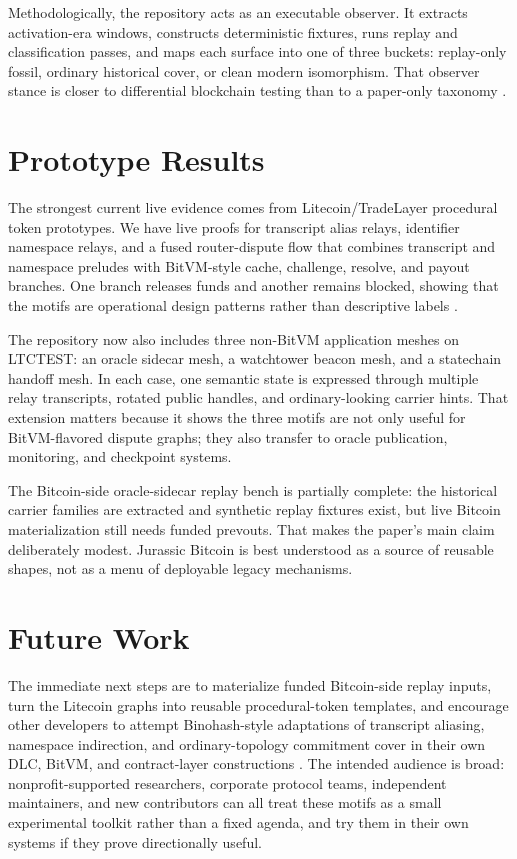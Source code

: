 \documentclass[10pt]{article}
\begin{document}
Methodologically, the repository acts as an executable observer. It extracts
activation-era windows, constructs deterministic fixtures, runs replay and
classification passes, and maps each surface into one of three buckets:
replay-only fossil, ordinary historical cover, or clean modern isomorphism.
That observer stance is closer to differential blockchain testing than to a
paper-only taxonomy \cite{yang2021fluffy,kim2025fork}.

\section*{Prototype Results}

The strongest current live evidence comes from Litecoin/TradeLayer procedural
token prototypes. We have live proofs for transcript alias relays, identifier
namespace relays, and a fused router-dispute flow that combines transcript and
namespace preludes with BitVM-style cache, challenge, resolve, and payout
branches. One branch releases funds and another remains blocked, showing that
the motifs are operational design patterns rather than descriptive labels
\cite{linus2023bitvm}.

The repository now also includes three non-BitVM application meshes on LTCTEST:
an oracle sidecar mesh, a watchtower beacon mesh, and a statechain handoff
mesh. In each case, one semantic state is expressed through multiple relay
transcripts, rotated public handles, and ordinary-looking carrier hints. That
extension matters because it shows the three motifs are not only useful for
BitVM-flavored dispute graphs; they also transfer to oracle publication,
monitoring, and checkpoint systems.

The Bitcoin-side oracle-sidecar replay bench is partially complete: the
historical carrier families are extracted and synthetic replay fixtures exist,
but live Bitcoin materialization still needs funded prevouts. That makes the
paper's main claim deliberately modest. Jurassic Bitcoin is best understood as a
source of reusable shapes, not as a menu of deployable legacy mechanisms.

\section*{Future Work}

The immediate next steps are to materialize funded Bitcoin-side replay inputs,
turn the Litecoin graphs into reusable procedural-token templates, and encourage
other developers to attempt Binohash-style adaptations of transcript aliasing,
namespace indirection, and ordinary-topology commitment cover in their own DLC,
BitVM, and contract-layer constructions \cite{linus2026binohash}. The intended
audience is broad: nonprofit-supported researchers, corporate protocol teams,
independent maintainers, and new contributors can all treat these motifs as a
small experimental toolkit rather than a fixed agenda, and try them in their
own systems if they prove directionally useful.



\end{document}
